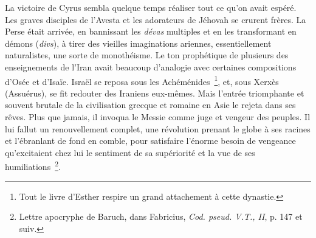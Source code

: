 \documentclass[french,twoside]{book} %
\begin{document}
La victoire de Cyrus sembla quelque temps réaliser tout ce qu’on avait espéré. Les graves disciples de l’Avesta et les adorateurs de Jéhovah se crurent frères. La Perse était arrivée, en bannissant les {\itshape dévas} multiples et en les transformant en démons ({\itshape divs}), à tirer des vieilles imaginations ariennes, essentiellement naturalistes, une sorte de monothéisme. Le ton prophétique de plusieurs des enseignements de l’Iran avait beaucoup d’analogie avec certaines compositions d’Osée et d’Isaïe. Israël se reposa sous les Achéménides \footnote{Tout le livre d’Esther respire un grand attachement à cette dynastie.}, et, sous Xerxès (Assuérus), se fit redouter des Iraniens eux-mêmes. Mais l’entrée triomphante et souvent brutale de la civilisation grecque et romaine en Asie le rejeta dans ses rêves. Plus que jamais, il invoqua le Messie comme juge et vengeur des peuples. Il lui fallut un renouvellement complet, une révolution prenant le globe à ses racines et l’ébranlant de fond en comble, pour satisfaire l’énorme besoin de vengeance qu’excitaient chez lui le sentiment de sa supériorité et la vue de ses humiliations \footnote{ Lettre apocryphe de Baruch, dans Fabricius, {\itshape Cod. pseud. V.T., II}, p. 147 et suiv.}.\par
\end{document}

